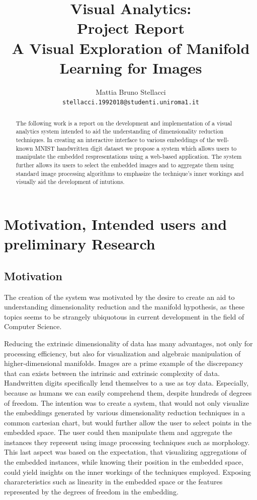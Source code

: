 \documentclass[11pt,a4paper]{article}
\title{Visual Analytics: \\ 
  Project Report \\
  A Visual Exploration of Manifold Learning for Images}
\author{Mattia Bruno Stellacci \\
    \texttt{stellacci.1992018@studenti.uniroma1.it}
  }
\date{}
\begin{document}
  \maketitle
  

  \begin{abstract}
  The following work is a report on the development and implementation of a visual analytics system intended to aid the understanding of dimensionality reduction techniques. In creating an interactive interface to various embeddings of the well-known MNIST handwritten digit dataset we propose a system which allows users to manipulate the embedded respresentations using a web-based application. The system further allows its users to select the embedded images and to aggregate them using standard image processing algorithms to emphasize the technique's inner workings and visually aid the development of intutions.     
  \end{abstract}



  \section{Motivation, Intended users and preliminary Research}
  \subsection {Motivation}
  The creation of the system was motivated by the desire to create an aid to understanding dimensionality reduction and the manifold hypothesis, as these topics seems to be strangely ubiquotous in current development in the field of Computer Science. 

  Reducing the extrinsic dimensionality of data has many advantages, not only for processing efficiency, but also for visualization and algebraic manipulation of higher-dimensional manifolds. 
  Images are a prime example of the discrepancy that can exists between the intrinsic and extrinsic complexity of data. Handwritten digits specifically lend themselves to a use as toy data. Especially, because as humans we can easily comprehend them, despite hundreds of degrees of freedom.
  The intention was to create a system, that would not only visualize the embeddings generated by various dimensionality reduction techniques in a common cartesian chart, but would further allow the user to select points in the embedded space. The user could then manipulate them and aggregate the instances they represent using image processing techniques such as morphology. This last aspect was based on the expectation, that visualizing aggregations of the embedded instances, while knowing their position in the embedded space, could yield insights on the inner workings of the techniques employed. Exposing chararcteristics such as linearity in the embedded space or the features represented by the degrees of freedom in the embedding.
\end{document}
